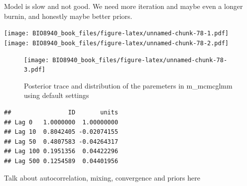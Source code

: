 \documentclass[
  12pt,
]{book}
\newenvironment{Shaded}{\begin{snugshade}}{\end{snugshade}}
\newcommand{\FunctionTok}[1]{\textcolor[rgb]{0.00,0.00,0.00}{#1}}
\newcommand{\NormalTok}[1]{#1}
\newcommand{\SpecialCharTok}[1]{\textcolor[rgb]{0.00,0.00,0.00}{#1}}
\begin{document}
Model is slow and not good. We need more iteration and maybe even a longer burnin, and honestly maybe better priors.

\begin{Shaded}
\end{Shaded}

\texttt{[image: BIO8940\_book\_files/figure-latex/unnamed-chunk-78-1.pdf]} \texttt{[image: BIO8940\_book\_files/figure-latex/unnamed-chunk-78-2.pdf]}

\begin{Shaded}
\end{Shaded}

\begin{figure}
\centering
\texttt{[image: BIO8940\_book\_files/figure-latex/unnamed-chunk-78-3.pdf]}
\caption{\label{fig:unnamed-chunk-78-3}Posterior trace and distribution of the paremeters in m\_mcmcglmm using default settings}
\end{figure}

\begin{Shaded}
\end{Shaded}

\begin{verbatim}
##                ID       units
## Lag 0   1.0000000  1.00000000
## Lag 10  0.8042405 -0.02074155
## Lag 50  0.4807583 -0.04264317
## Lag 100 0.1951356  0.04422296
## Lag 500 0.1254589  0.04401956
\end{verbatim}

Talk about autocorrelation, mixing, convergence and priors here
\end{document}
